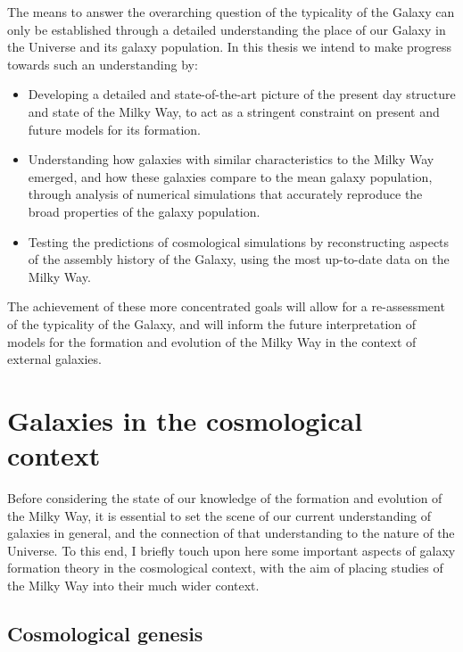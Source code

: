 The means to answer the overarching question of the typicality of the Galaxy can only be established through a detailed understanding the place of our Galaxy in the Universe and its galaxy population. In this thesis we intend to make progress towards such an understanding by:
\begin{itemize}
    \item Developing a detailed and state-of-the-art picture of the present day structure and state of the Milky Way, to act as a stringent constraint on present and future models for its formation.
    \item Understanding how galaxies with similar characteristics to the Milky Way emerged, and how these galaxies compare to the mean galaxy population, through analysis of numerical simulations that accurately reproduce the broad properties of the galaxy population.
    \item Testing the predictions of cosmological simulations by reconstructing aspects of the assembly history of the Galaxy, using the most up-to-date data on the Milky Way.
\end{itemize}
The achievement of these more concentrated goals will allow for a re-assessment of the typicality of the Galaxy, and will inform the future interpretation of models for the formation and evolution of the Milky Way in the context of external galaxies.

\section{Galaxies in the cosmological context}

Before considering the state of our knowledge of the formation and evolution of the Milky Way, it is essential to set the scene of our current understanding of galaxies in general, and the connection of that understanding to the nature of the Universe. To this end, I briefly touch upon here some important aspects of galaxy formation theory in the cosmological context, with the aim of placing studies of the Milky Way into their much wider context.

\subsection{Cosmological genesis}

